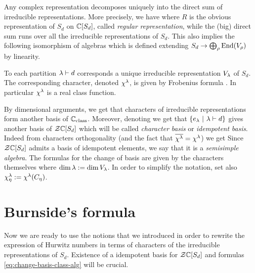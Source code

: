 \documentclass[../main/main.tex]{subfiles}
\begin{document}
Any complex representation decomposes uniquely into the direct sum of irreducible representations. More precisely, we have
where $R$ is the obvious representation of $S_d$ on $\mathbb C[S_d]$, called \emph{regular representation}, while the (big) direct sum runs over all the irreducible representations of $S_d$. This also implies the following isomorphism of algebras
which is defined extending $S_d\to\bigoplus_\rho\operatorname{End}(V_\rho)$ by linearity.

\begin{theorem}[{\cite[Thm. 4.3]{FH}}]
	To each partition $\lambda\vdash d$ corresponds a unique irreducible representation $V_\lambda$ of $S_d$. The corresponding character, denoted $\chi^\lambda$, is given by Frobenius formula \cite[Eq. 4.10]{FH}. In particular $\chi^\lambda$ is a real class function.
\end{theorem}

By dimensional arguments, we get that characters of irreducible representations form another basis of $\mathbb C_{\text{class}}$. Moreover, denoting
we get that $\{e_\lambda\ |\ \lambda\vdash d\}$ gives another basis of $\mathcal Z\mathbb C[S_d]$
which will be called \emph{character basis} or \emph{idempotent basis}. Indeed from characters orthogonality (and the fact that $\overline{\chi^\lambda}=\chi^\lambda$) we get
Since $\mathcal Z\mathbb C[S_d]$ admits a basis of idempotent elements, we say that it is a \emph{semisimple algebra}. The formulas for the change of basis are given by the characters themselves
where $\dim \lambda:=\dim V_\lambda$. In order to simplify the notation, set also $\chi^\lambda_\eta:=\chi^\lambda(C_\eta)$. 

\section{Burnside's formula}

Now we are ready to use the notions that we introduced in order to rewrite the expression of Hurwitz numbers in terms of characters of the irreducible representations of $S_d$. Existence of a idempotent basis for $\mathcal Z\mathbb C[S_d]$ and formulas \eqref{eq:change-basis-class-alg} will be crucial. 
\end{document}

